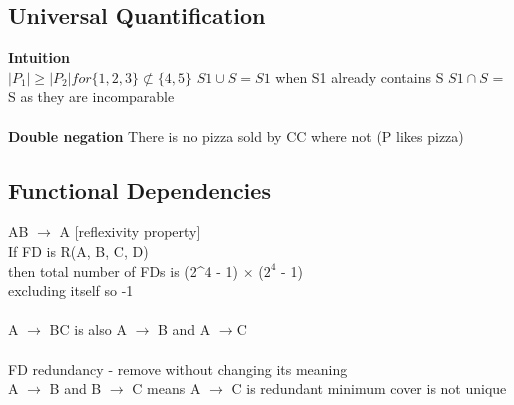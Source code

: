\documentclass[11pt]{article}
\begin{document}
\subsection*{Universal Quantification}
\textbf{Intuition}
\\
$|P_{1}| \geq |P_{2}| for \{1, 2, 3\} \not\subset \{4, 5\}$
$S1 \cup S = S1$ when S1 already contains S
$S1 \cap S$ = S
as they are incomparable
\\\\
\textbf{Double negation}
There is no pizza sold by CC where not (P likes pizza) 
\subsection*{Functional Dependencies}
AB $\rightarrow$ A [reflexivity property]\\
If FD is R(A, B, C, D)\\
then total number of FDs is (2^4 - 1) $\times$  ($2^4$ - 1)\\
excluding itself so -1\\
\\
A $\rightarrow$ BC is also A $\rightarrow$ B and A $\rightarrow $C
\\\\
FD redundancy - remove without changing its meaning\\
A $\rightarrow$ B and B $\rightarrow$ C means A $\rightarrow$ C is redundant
minimum cover is not unique
\end{document}
